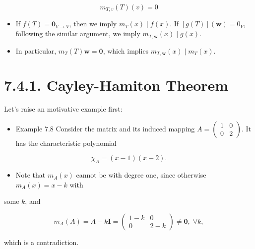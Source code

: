 \documentclass[11pt]{article}
\begin{document}
\[
{m}_{T,v}\left( T\right) \left( v\right)  = 0
\]

\begin{itemize}
\item If \(f\left( T\right)  = {\mathbf{0}}_{V \rightarrow  V}\), then we imply \({m}_{T}\left( x\right)  \mid  f\left( x\right)\). If \(\left\lbrack  {g\left( T\right) }\right\rbrack  \left( \mathbf{w}\right)  = {0}_{V}\), following the similar argument, we imply \({m}_{T,\mathbf{w}}\left( x\right)  \mid  g\left( x\right)\).
\end{itemize}

\begin{itemize}
\item In particular, \({m}_{T}\left( T\right) \mathbf{w} = \mathbf{0}\), which implies \({m}_{T,\mathbf{w}}\left( x\right)  \mid  {m}_{T}\left( x\right)\).
\end{itemize}

\section*{7.4.1. Cayley-Hamiton Theorem}

Let's raise an motivative example first:

\begin{itemize}
\item Example 7.8 Consider the matrix and its induced mapping \(A = \left( \begin{array}{ll} 1 & 0 \\  0 & 2 \end{array}\right)\). It has the characteristic polynomial
\end{itemize}

\[
{\chi }_{A} = \left( {x - 1}\right) \left( {x - 2}\right) .
\]

\begin{itemize}
\item Note that \({m}_{A}\left( x\right)\) cannot be with degree one, since otherwise \({m}_{A}\left( x\right)  = x - k\) with
\end{itemize}

some \(k\), and

\[
{m}_{A}\left( A\right)  = A - k\mathbf{I} = \left( \begin{matrix} 1 - k & 0 \\  0 & 2 - k \end{matrix}\right)  \neq  \mathbf{0},\;\forall k,
\]

which is a contradiction.
\end{document}
